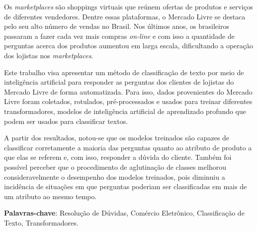 \documentclass[12pt, %
openright, 
oneside, %
a4paper,    %
brazil]{facom-ufu-abntex2}
\begin{document}
\begin{resumo} %
 Os \textit{marketplaces} são shoppings virtuais que reúnem ofertas de produtos e serviços de diferentes vendedores. Dentre essas plataformas, o Mercado Livre se destaca pelo seu alto número de vendas no Brasil. Nos últimos anos, os brasileiros passaram a fazer cada vez mais compras \textit{on-line} e com isso a quantidade de perguntas acerca dos produtos aumentou em larga escala, dificultando a operação dos lojistas nos \textit{marketplaces}.

 Este trabalho visa apresentar um método de classificação de texto por meio de inteligência artificial para responder as perguntas dos clientes de lojistas do Mercado Livre de forma automatizada. Para isso, dados provenientes do Mercado Livre foram coletados, rotulados, pré-processados e usados para treinar diferentes transformadores, modelos de inteligência artificial de aprendizado profundo que podem ser usados para classificar textos.

 A partir dos resultados, notou-se que os modelos treinados são capazes de classificar corretamente a maioria das perguntas quanto ao atributo de produto a que elas se referem e, com isso, responder a dúvida do cliente. Também foi possível perceber que o procedimento de aglutinação de classes melhorou consideravelmente o desempenho dos modelos treinados, pois diminuiu a incidência de situações em que perguntas poderiam ser classificadas em mais de um atributo ao mesmo tempo.

 \vspace{\onelineskip}
    
 \noindent
 \textbf{Palavras-chave}: Resolução de Dúvidas, Comércio Eletrônico, Classificação de Texto, Transformadores. %
\end{resumo}

\listoffigures*
\cleardoublepage

\listoftables*
\cleardoublepage




\end{document}
